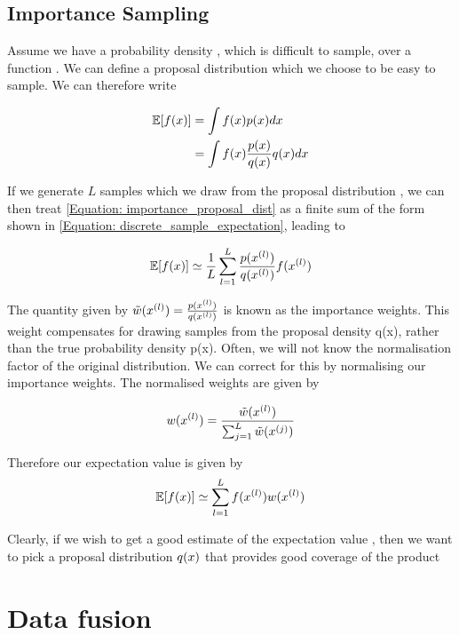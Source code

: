 \subsection{Importance Sampling}

Assume we have a probability density \probx, which is difficult to sample, over a function \funcx. We can define a proposal distribution \propx which we choose to be easy to sample. We can therefore write

\begin{align}
\mathbb{E}[f(x)] &= \int f(x)p(x) dx \nonumber \\
		&= \int f(x)\frac{p(x)}{q(x)}q(x) dx \label{Equation: importance_proposal_dist} 
\end{align}

If we generate $L$ samples  which we draw from the proposal distribution \propx, we can then treat \eqref{Equation: importance_proposal_dist} as a finite sum of the form shown in \eqref{Equation: discrete_sample_expectation}, leading to

\begin{equation}
\mathbb{E}[f(x)] \simeq \frac{1}{L} \sum_{l=1}^{L} \frac{p(x^{(l)})}{q(x^{(l)})}f(x^{(l)})
\end{equation}

The quantity given by $\tilde{w}(x^{(l)})=\frac{p(x^{(l)})}{q(x^{(l)})}$ is known as the importance weights. This weight compensates for drawing samples from the proposal density q(x), rather than the true probability density p(x). Often, we will not know the normalisation factor of the original distribution. We can correct for this by normalising our importance weights. The normalised weights are given by

\begin{equation}
w(x^{(l)})= \frac{\tilde{w}(x^{(l)})}{\sum^{L}_{j=1} \tilde{w}(x^{(j)})}
\end{equation}

Therefore our expectation value is given by
\begin{equation}
\mathbb{E}[f(x)]\simeq \sum\limits_{l=1}^{L} f(x^{(l)})w(x^{(l)})
\end{equation}

Clearly, if we wish to get a good estimate of the expectation value \expectation{\funcx}, then we want to pick a proposal distribution $q(x)$ that provides good coverage of the product \funcx\probx

\section{Data fusion}

